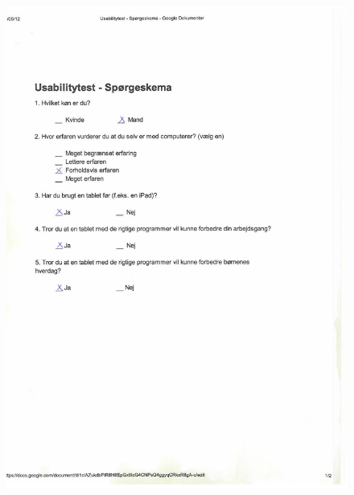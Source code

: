 \begin{figure}[H]
	\centering
		\includegraphics[width=\textwidth]{input/appendices/demod1.pdf}
	\label{fig:demot2}
\end{figure}

